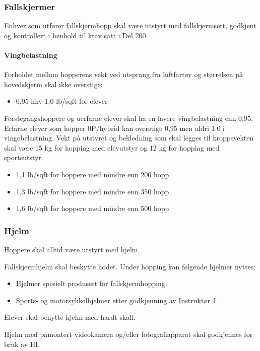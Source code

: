 \subsubsection{Fallskjermer}
Enhver som utfører fallskjermhopp skal være utstyrt med fallskjermsett, godkjent og kontrollert i henhold til krav satt i Del 200.

\paragraph{Vingbelastning}
Forholdet mellom hopperens vekt ved utsprang fra luftfartøy og størrelsen på hovedskjerm skal ikke overstige:

\begin{itemize}
	\item 0,95 hhv 1,0 lb/sqft for elever
\end{itemize}

Førstegangshoppere og uerfarne elever skal ha en lavere vingbelastning enn 0,95. Erfarne elever som hopper 0P/hybrid kan overstige 0,95 men aldri 1.0 i vingebelastning. Vekt på utstyret og bekledning som skal legges til kroppsvekten skal være 15 kg for hopping med elevutstyr og 12 kg for hopping med sportsutstyr.

\begin{itemize}
	\item 1,1 lb/sqft for hoppere med mindre enn 200 hopp
	\item 1,3 lb/sqft for hoppere med mindre enn 350 hopp
	\item 1,6 lb/sqft for hoppere med mindre enn 500 hopp
\end{itemize}

\subsubsection{Hjelm}
Hoppere skal alltid være utstyrt med hjelm.

Fallskjermhjelm skal beskytte hodet. Under hopping kan følgende hjelmer nyttes:
\begin{itemize}
	\item Hjelmer spesielt produsert for fallskjermhopping.
	\item Sports- og motorsykkelhjelmer etter godkjenning av Instruktør 1.
\end{itemize}

Elever skal benytte hjelm med hardt skall.

Hjelm med påmontert videokamera og/eller fotografiapparat skal godkjennes for bruk av HI.

